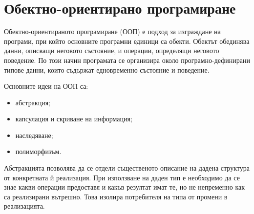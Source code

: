 \begin{konspekt}
\end{konspekt}

\section{Обектно-ориентирано програмиране}\label{s:16.1}

\begin{defn}
Обектно-ориентираното програмиране (ООП) е подход за изграждане на програми, при който основните програмни единици са обекти. Обектът обединява данни, описващи неговото състояние, и операции, определящи неговото поведение. По този начин програмата се организира около програмно-дефинирани типове данни, които съдържат едновременно състояние и поведение.
\end{defn}

Основните идеи на ООП са:

\begin{itemize}
    \item абстракция;
    \item капсулация и скриване на информация;
    \item наследяване;
    \item полиморфизъм.
\end{itemize}

\begin{defn}[Абстракция]
Абстракцията позволява да се отдели същественото описание на дадена структура от конкретната й реализация. При използване на даден тип е необходимо да се знае какви операции предоставя и какъв резултат имат те, но не непременно как са реализирани вътрешно. Това изолира потребителя на типа от промени в реализацията.
\end{defn}

